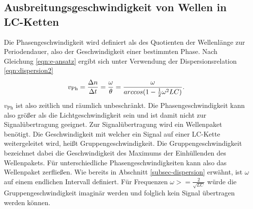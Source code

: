 \subsection{Ausbreitungsgeschwindigkeit von Wellen in LC-Ketten}
Die Phasengeschwindigkeit wird definiert als des Quotienten der Wellenlänge zur Periodendauer, also der Geschwindigkeit einer bestimmten Phase.
Nach Gleichung \eqref{eqn:e-ansatz} ergibt sich unter Verwendung der Dispersionsrelation  \eqref{eqn:dispersion2}
\begin{equation}
\centering
\label{eqn:v-phase}
v_{\mathrm{Ph}}=\frac{ \Delta n}{ \Delta t}=\frac{\omega}{\theta}=\frac{\omega}{arccos(1-\frac{1}{2}\omega^2LC)}.
\end{equation}
$v_{\mathrm{Ph}}$ ist also zeitlich und räumlich unbeschränkt. Die Phasengeschwindigkeit kann also größer als die Lichtgeschwindigkeit sein und ist damit nicht zur Signalübertragung geeignet.
Zur Signalübertragung wird ein Wellenpaket benötigt.
Die Geschwindigkeit mit welcher ein Signal auf einer LC-Kette weitergeleitet wird, heißt Gruppengeschwindigkeit.
Die Gruppengeschwindigkeit bezeichnet dabei die Geschwindigkeit des Maximums der Einhüllenden des Wellenpakets.
Für unterschiedliche Phasengeschwindigkeiten kann also das Wellenpaket zerfließen.
Wie bereits in Abschnitt \ref{subsec-dispersion} erwähnt, ist $\omega$ auf einem endlichen Intervall definiert.
Für Frequenzen $\omega>=\frac{2}{\sqrt{LC}}$ würde die Gruppengeschwindigkeit imaginär werden und folglich kein Signal übertragen werden können.
